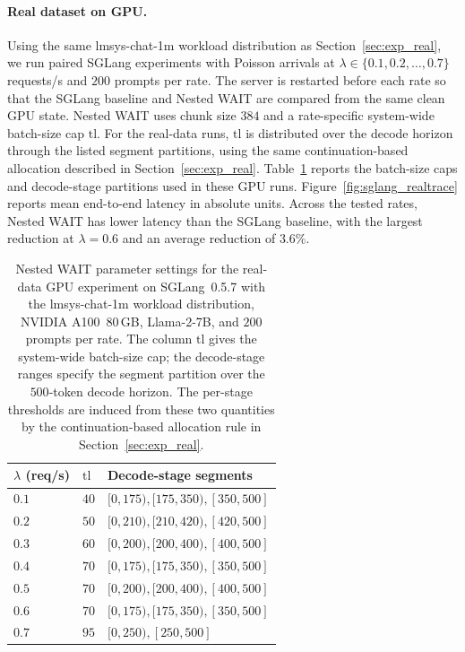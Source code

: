 \paragraph{Real dataset on GPU.}
Using the same lmsys-chat-1m workload distribution as Section~\ref{sec:exp_real}, we run paired SGLang experiments with Poisson arrivals at $\lambda \in \{0.1, 0.2, \ldots, 0.7\}$ requests/s and $200$ prompts per rate. The server is restarted before each rate so that the SGLang baseline and Nested WAIT are compared from the same clean GPU state. Nested WAIT uses chunk size $384$ and a rate-specific system-wide batch-size cap $\mathrm{tl}$. For the real-data runs, $\mathrm{tl}$ is distributed over the decode horizon through the listed segment partitions, using the same continuation-based allocation described in Section~\ref{sec:exp_real}. Table~\ref{tab:sglang_realtrace} reports the batch-size caps and decode-stage partitions used in these GPU runs. Figure~\ref{fig:sglang_realtrace} reports mean end-to-end latency in absolute units. Across the tested rates, Nested WAIT has lower latency than the SGLang baseline, with the largest reduction at $\lambda = 0.6$ and an average reduction of $3.6\%$.

\begin{table}[ht]
\centering
\small
\begin{tabularx}{0.82\textwidth}{>{\centering\arraybackslash}p{}>{\centering\arraybackslash}p{}>{\centering\arraybackslash}X}
\toprule
$\lambda$ (req/s) & $\mathrm{tl}$ & Decode-stage segments \\
\midrule
$0.1$ & $40$  & $[0,175), [175,350), [350,500]$ \\
$0.2$ & $50$  & $[0,210), [210,420), [420,500]$ \\
$0.3$ & $60$  & $[0,200), [200,400), [400,500]$ \\
$0.4$ & $70$  & $[0,175), [175,350), [350,500]$ \\
$0.5$ & $70$  & $[0,200), [200,400), [400,500]$ \\
$0.6$ & $70$  & $[0,175), [175,350), [350,500]$ \\
$0.7$ & $95$  & $[0,250), [250,500]$ \\
\bottomrule
\end{tabularx}
\caption{Nested WAIT parameter settings for the real-data GPU experiment on SGLang~0.5.7 with the lmsys-chat-1m workload distribution, NVIDIA A100~80\,GB, Llama-2-7B, and $200$ prompts per rate. The column $\mathrm{tl}$ gives the system-wide batch-size cap; the decode-stage ranges specify the segment partition over the $500$-token decode horizon. The per-stage thresholds are induced from these two quantities by the continuation-based allocation rule in Section~\ref{sec:exp_real}.}
\label{tab:sglang_realtrace}
\end{table}

